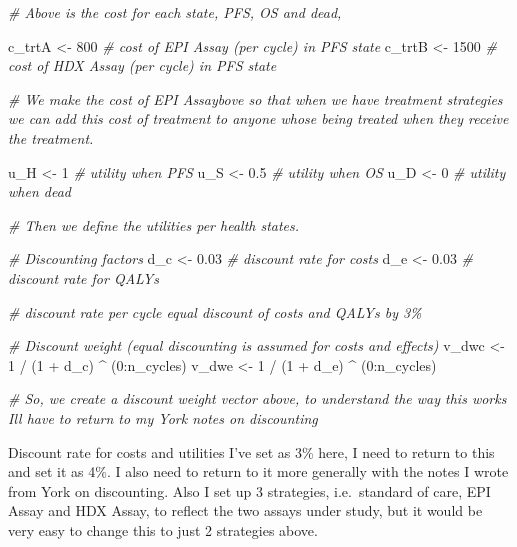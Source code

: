 \documentclass[
]{article}
\newenvironment{Shaded}{\begin{snugshade}}{\end{snugshade}}
\newcommand{\CommentTok}[1]{\textcolor[rgb]{0.56,0.35,0.01}{\textit{#1}}}
\newcommand{\DecValTok}[1]{\textcolor[rgb]{0.00,0.00,0.81}{#1}}
\newcommand{\FloatTok}[1]{\textcolor[rgb]{0.00,0.00,0.81}{#1}}
\newcommand{\NormalTok}[1]{#1}
\newcommand{\OtherTok}[1]{\textcolor[rgb]{0.56,0.35,0.01}{#1}}
\newcommand{\SpecialCharTok}[1]{\textcolor[rgb]{0.00,0.00,0.00}{#1}}
\begin{document}
\begin{Shaded}
\begin{Highlighting}[]
\CommentTok{\# Above is the cost for each state, PFS, OS and dead,}

\NormalTok{c\_trtA    }\OtherTok{\textless{}{-}} \DecValTok{800}   \CommentTok{\# cost of EPI Assay (per cycle) in PFS state}
\NormalTok{c\_trtB    }\OtherTok{\textless{}{-}} \DecValTok{1500}  \CommentTok{\# cost of HDX Assay (per cycle) in PFS state}

\CommentTok{\# We make the cost of EPI Assaybove so that when we have treatment strategies we can add this cost of treatment to anyone whose being treated when they receive the treatment.}

\NormalTok{u\_H       }\OtherTok{\textless{}{-}} \DecValTok{1}     \CommentTok{\# utility when PFS }
\NormalTok{u\_S       }\OtherTok{\textless{}{-}} \FloatTok{0.5}   \CommentTok{\# utility when OS}
\NormalTok{u\_D       }\OtherTok{\textless{}{-}} \DecValTok{0}     \CommentTok{\# utility when dead}

\CommentTok{\# Then we define the utilities per health states.}


\CommentTok{\# Discounting factors}
\NormalTok{d\_c             }\OtherTok{\textless{}{-}} \FloatTok{0.03}                          
\CommentTok{\# discount rate for costs}
\NormalTok{d\_e             }\OtherTok{\textless{}{-}} \FloatTok{0.03}                          
\CommentTok{\# discount rate for QALYs}

\CommentTok{\# discount rate per cycle equal discount of costs and QALYs by 3\%}

\CommentTok{\# Discount weight (equal discounting is assumed for costs and effects)}
\NormalTok{v\_dwc }\OtherTok{\textless{}{-}} \DecValTok{1} \SpecialCharTok{/}\NormalTok{ (}\DecValTok{1} \SpecialCharTok{+}\NormalTok{ d\_c) }\SpecialCharTok{\^{}}\NormalTok{ (}\DecValTok{0}\SpecialCharTok{:}\NormalTok{n\_cycles) }
\NormalTok{v\_dwe }\OtherTok{\textless{}{-}} \DecValTok{1} \SpecialCharTok{/}\NormalTok{ (}\DecValTok{1} \SpecialCharTok{+}\NormalTok{ d\_e) }\SpecialCharTok{\^{}}\NormalTok{ (}\DecValTok{0}\SpecialCharTok{:}\NormalTok{n\_cycles) }

\CommentTok{\# So, we create a discount weight vector above, to understand the way this works I\textquotesingle{}ll have to return to my York notes on discounting}
\end{Highlighting}
\end{Shaded}

Discount rate for costs and utilities I've set as 3\% here, I need to
return to this and set it as 4\%. I also need to return to it more
generally with the notes I wrote from York on discounting. Also I set up
3 strategies, i.e.~standard of care, EPI Assay and HDX Assay, to reflect
the two assays under study, but it would be very easy to change this to
just 2 strategies above.
\end{document}
